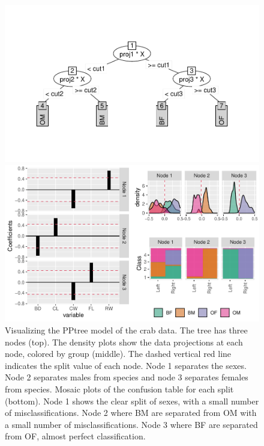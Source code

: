 \documentclass[smallextended,natbib]{svjour3}\usepackage[]{graphicx}\usepackage[]{xcolor}
\makeatletter
\def\maxwidth{ %
  \ifdim\Gin@nat@width>\linewidth
    \linewidth
  \else
    \Gin@nat@width
  \fi
}
\newenvironment{knitrout}{}{} %
\makeatother
\begin{document}
\begin{figure}[hbpt]
\centering
\begin{knitrout}
\color{fgcolor}
\includegraphics[width=\maxwidth]{trcomb-1} 

\includegraphics[width=\maxwidth]{trcomb-2} 
\end{knitrout}
\caption{Visualizing the PPtree model of the crab data. The tree has three nodes (top). The density plots show the data projections at each node, colored by group (middle). The dashed vertical red line indicates the split value of each node. Node 1 separates the sexes. Node 2 separates males from species and node 3 separates females from species. Mosaic plots of the confusion table for each split (bottom). Node 1 shows the clear split of sexes, with a small number of misclassifications. Node 2 where BM are separated from OM with a small number of misclassifications. Node 3 where BF are separated from OF, almost perfect classification.\label{pptreeviz1}}
\end{figure}
\end{document}
